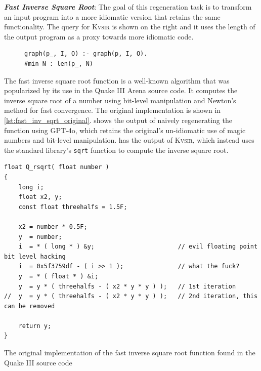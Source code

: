 \documentclass[nonacm,sigplan,review]{acmart}
\def\gptmodel{{GPT-4o}\xspace}
\newcommand{\sys}{{\scshape Kv{\textalpha}sir}\xspace}
\newcommand{\heading}[1]{\vspace{2pt}\noindent\textbf{\emph{#1}}:\enspace}
\newcommand{\ttt}[1]{\texttt{#1}\xspace}
\begin{document}
\heading{Fast Inverse Square Root}
The goal of this regeneration task is to transform an input 
program into a more idiomatic version that retains the same functionality.
The query for \sys is shown on the right and it uses the length of the output program as a proxy towards 
more idiomatic code.
\begin{figure}
\begin{verbatim}
graph(p_, I, O) :- graph(p, I, O).
#min N : len(p_, N)
\end{verbatim}
\end{figure}
The fast inverse square root function is a well-known algorithm that was
popularized by its use in the Quake III Arena source code.
It computes the inverse square root of a number using bit-level manipulation and
Newton's method for fast convergence.
The original implementation is shown in \cref{lst:fast_inv_sqrt_original}.
 shows the output of naively regenerating the function using \gptmodel,
which retains the original's un-idiomatic use of magic numbers and bit-level manipulation.
 has the output of \sys, which instead uses the standard library's
\ttt{sqrt} function to compute the inverse square root.

\begin{listing}[htpb]
\begin{verbatim}
float Q_rsqrt( float number )
{
	long i;
	float x2, y;
	const float threehalfs = 1.5F;

	x2 = number * 0.5F;
	y  = number;
	i  = * ( long * ) &y;                       // evil floating point bit level hacking
	i  = 0x5f3759df - ( i >> 1 );               // what the fuck?
	y  = * ( float * ) &i;
	y  = y * ( threehalfs - ( x2 * y * y ) );   // 1st iteration
//	y  = y * ( threehalfs - ( x2 * y * y ) );   // 2nd iteration, this can be removed

	return y;
}
\end{verbatim}
  \caption{The original implementation of the fast inverse square root function 
  found in the Quake III source code~\cite{fast_inv_sqrt}}
  \label{lst:fast_inv_sqrt_original}
\end{listing}
\end{document}
